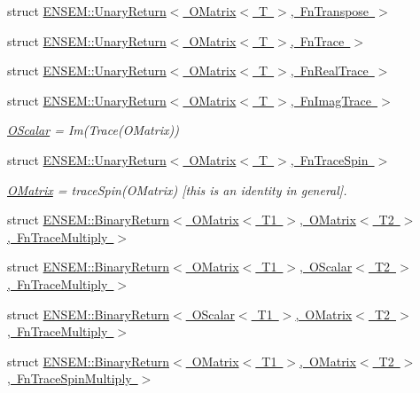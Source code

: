 \begin{DoxyCompactItemize}
struct \mbox{\hyperlink{structENSEM_1_1UnaryReturn_3_01OMatrix_3_01T_01_4_00_01FnTranspose_01_4}{E\+N\+S\+E\+M\+::\+Unary\+Return$<$ O\+Matrix$<$ T $>$, Fn\+Transpose $>$}}
\item 
struct \mbox{\hyperlink{structENSEM_1_1UnaryReturn_3_01OMatrix_3_01T_01_4_00_01FnTrace_01_4}{E\+N\+S\+E\+M\+::\+Unary\+Return$<$ O\+Matrix$<$ T $>$, Fn\+Trace $>$}}
\item 
struct \mbox{\hyperlink{structENSEM_1_1UnaryReturn_3_01OMatrix_3_01T_01_4_00_01FnRealTrace_01_4}{E\+N\+S\+E\+M\+::\+Unary\+Return$<$ O\+Matrix$<$ T $>$, Fn\+Real\+Trace $>$}}
\item 
struct \mbox{\hyperlink{structENSEM_1_1UnaryReturn_3_01OMatrix_3_01T_01_4_00_01FnImagTrace_01_4}{E\+N\+S\+E\+M\+::\+Unary\+Return$<$ O\+Matrix$<$ T $>$, Fn\+Imag\+Trace $>$}}
\begin{DoxyCompactList}\small\item\em \mbox{\hyperlink{classENSEM_1_1OScalar}{O\+Scalar}} = Im(\+Trace(\+O\+Matrix)) \end{DoxyCompactList}\item 
struct \mbox{\hyperlink{structENSEM_1_1UnaryReturn_3_01OMatrix_3_01T_01_4_00_01FnTraceSpin_01_4}{E\+N\+S\+E\+M\+::\+Unary\+Return$<$ O\+Matrix$<$ T $>$, Fn\+Trace\+Spin $>$}}
\begin{DoxyCompactList}\small\item\em \mbox{\hyperlink{classENSEM_1_1OMatrix}{O\+Matrix}} = trace\+Spin(\+O\+Matrix) \mbox{[}this is an identity in general\mbox{]}. \end{DoxyCompactList}\item 
struct \mbox{\hyperlink{structENSEM_1_1BinaryReturn_3_01OMatrix_3_01T1_01_4_00_01OMatrix_3_01T2_01_4_00_01FnTraceMultiply_01_4}{E\+N\+S\+E\+M\+::\+Binary\+Return$<$ O\+Matrix$<$ T1 $>$, O\+Matrix$<$ T2 $>$, Fn\+Trace\+Multiply $>$}}
\item 
struct \mbox{\hyperlink{structENSEM_1_1BinaryReturn_3_01OMatrix_3_01T1_01_4_00_01OScalar_3_01T2_01_4_00_01FnTraceMultiply_01_4}{E\+N\+S\+E\+M\+::\+Binary\+Return$<$ O\+Matrix$<$ T1 $>$, O\+Scalar$<$ T2 $>$, Fn\+Trace\+Multiply $>$}}
\item 
struct \mbox{\hyperlink{structENSEM_1_1BinaryReturn_3_01OScalar_3_01T1_01_4_00_01OMatrix_3_01T2_01_4_00_01FnTraceMultiply_01_4}{E\+N\+S\+E\+M\+::\+Binary\+Return$<$ O\+Scalar$<$ T1 $>$, O\+Matrix$<$ T2 $>$, Fn\+Trace\+Multiply $>$}}
\item 
struct \mbox{\hyperlink{structENSEM_1_1BinaryReturn_3_01OMatrix_3_01T1_01_4_00_01OMatrix_3_01T2_01_4_00_01FnTraceSpinMultiply_01_4}{E\+N\+S\+E\+M\+::\+Binary\+Return$<$ O\+Matrix$<$ T1 $>$, O\+Matrix$<$ T2 $>$, Fn\+Trace\+Spin\+Multiply $>$}}

\end{DoxyCompactItemize}
